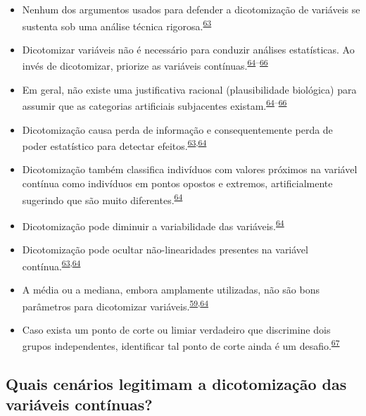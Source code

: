 \documentclass[
  a4paper,
]{book}
\begin{document}
\begin{itemize}
\item
  Nenhum dos argumentos usados para defender a dicotomização de variáveis se sustenta sob uma análise técnica rigorosa.\textsuperscript{\protect\hyperlink{ref-MacCallum2002}{63}}
\item
  Dicotomizar variáveis não é necessário para conduzir análises estatísticas. Ao invés de dicotomizar, priorize as variáveis contínuas.\textsuperscript{\protect\hyperlink{ref-Altman2006}{64}--\protect\hyperlink{ref-Collins2016}{66}}
\item
  Em geral, não existe uma justificativa racional (plausibilidade biológica) para assumir que as categorias artificiais subjacentes existam.\textsuperscript{\protect\hyperlink{ref-Altman2006}{64}--\protect\hyperlink{ref-Collins2016}{66}}
\item
  Dicotomização causa perda de informação e consequentemente perda de poder estatístico para detectar efeitos.\textsuperscript{\protect\hyperlink{ref-MacCallum2002}{63},\protect\hyperlink{ref-Altman2006}{64}}
\item
  Dicotomização também classifica indivíduos com valores próximos na variável contínua como indivíduos em pontos opostos e extremos, artificialmente sugerindo que são muito diferentes.\textsuperscript{\protect\hyperlink{ref-Altman2006}{64}}
\item
  Dicotomização pode diminuir a variabilidade das variáveis.\textsuperscript{\protect\hyperlink{ref-Altman2006}{64}}
\item
  Dicotomização pode ocultar não-linearidades presentes na variável contínua.\textsuperscript{\protect\hyperlink{ref-MacCallum2002}{63},\protect\hyperlink{ref-Altman2006}{64}}
\item
  A média ou a mediana, embora amplamente utilizadas, não são bons parâmetros para dicotomizar variáveis.\textsuperscript{\protect\hyperlink{ref-Fedorov2009}{59},\protect\hyperlink{ref-Altman2006}{64}}
\item
  Caso exista um ponto de corte ou limiar verdadeiro que discrimine dois grupos independentes, identificar tal ponto de corte ainda é um desafio.\textsuperscript{\protect\hyperlink{ref-Prince2017}{67}}
\end{itemize}

\hypertarget{quais-cenuxe1rios-legitimam-a-dicotomizauxe7uxe3o-das-variuxe1veis-contuxednuas}{%
\subsection{Quais cenários legitimam a dicotomização das variáveis contínuas?}\label{quais-cenuxe1rios-legitimam-a-dicotomizauxe7uxe3o-das-variuxe1veis-contuxednuas}}
\end{document}
